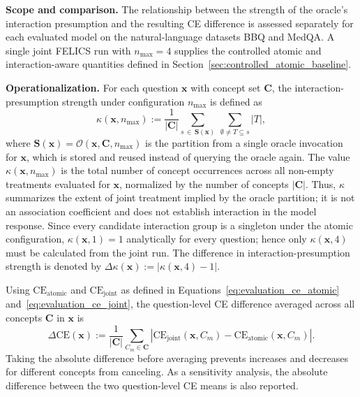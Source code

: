 \noindent\textbf{Scope and comparison.} The relationship between the strength of the oracle's interaction presumption and the resulting CE difference is assessed separately for each evaluated model on the natural-language datasets BBQ and MedQA. A single joint FELICS run with $n_{\max}=4$ supplies the controlled atomic and interaction-aware quantities defined in Section~\ref{sec:controlled_atomic_baseline}.

\noindent\textbf{Operationalization.} For each question $\mathbf{x}$ with concept set $\mathbf{C}$, the interaction-presumption strength under configuration $n_{\max}$ is defined as
\begin{equation}
	\kappa(\mathbf{x}, n_{\max}) := \frac{1}{|\mathbf{C}|} \sum_{s \,\in\, \mathbf{S}(\mathbf{x})} \ \sum_{\emptyset \neq T \subseteq s} |T|,
\end{equation}
where $\mathbf{S}(\mathbf{x})=\mathcal{O}(\mathbf{x},\mathbf{C},n_{\max})$ is the partition from a single oracle invocation for $\mathbf{x}$, which is stored and reused instead of querying the oracle again. The value $\kappa(\mathbf{x},n_{\max})$ is the total number of concept occurrences across all non-empty treatments evaluated for $\mathbf{x}$, normalized by the number of concepts $|\mathbf{C}|$. Thus, $\kappa$ summarizes the extent of joint treatment implied by the oracle partition; it is not an association coefficient and does not establish interaction in the model response. Since every candidate interaction group is a singleton under the atomic configuration, $\kappa(\mathbf{x},1)=1$ analytically for every question; hence only $\kappa(\mathbf{x},4)$ must be calculated from the joint run. The difference in interaction-presumption strength is denoted by $\Delta\kappa(\mathbf{x}) := |\kappa(\mathbf{x},4)-1|$.

Using $\mathrm{CE}_{\mathrm{atomic}}$ and $\mathrm{CE}_{\mathrm{joint}}$ as defined in Equations~\ref{eq:evaluation_ce_atomic} and~\ref{eq:evaluation_ce_joint}, the question-level CE difference averaged across all concepts $\mathbf{C}$ in $\mathbf{x}$ is
\begin{equation}
	\Delta \mathrm{CE}(\mathbf{x}) := \frac{1}{|\mathbf{C}|}\sum_{C_m\in\mathbf{C}}
	\left|\mathrm{CE}_{\mathrm{joint}}(\mathbf{x},C_m)-\mathrm{CE}_{\mathrm{atomic}}(\mathbf{x},C_m)\right|.
\end{equation}
Taking the absolute difference before averaging prevents increases and decreases for different concepts from canceling. As a sensitivity analysis, the absolute difference between the two question-level CE means is also reported.

